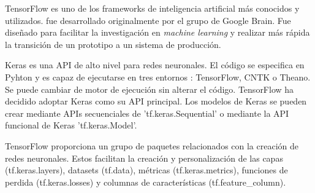 TensorFlow\cite{TensorYKeras}\cite{TensorYKeras2} es uno de los frameworks de inteligencia artificial más conocidos y utilizados. fue desarrollado originalmente por el grupo de Google Brain. Fue diseñado para facilitar la investigación en \textit{machine learning} y realizar más rápida la transición de un prototipo a un sistema de producción. 

Keras es una API de alto nivel para redes neuronales. El código se especifica en Pyhton y es capaz de ejecutarse en tres entornos : TensorFlow, CNTK o Theano. Se puede cambiar de motor de ejecución sin alterar el código. TensorFlow ha decidido adoptar Keras como su API principal. Los modelos de Keras se pueden crear mediante APIs secuenciales de 'tf.keras.Sequential' o mediante la API funcional de Keras 'tf.keras.Model'.

TensorFlow proporciona un grupo de paquetes relacionados con la creación de redes neuronales. Estos facilitan la creación y personalización de las capas (tf.keras.layers), datasets (tf.data), métricas (tf.keras.metrics), funciones de perdida (tf.keras.losses) y columnas de características (tf.feature\_column).


